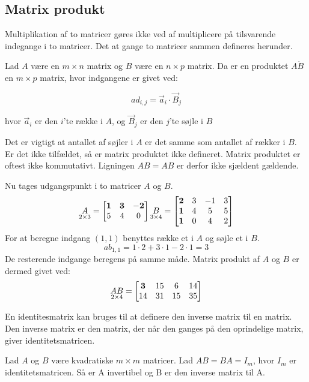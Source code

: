 \subsection{Matrix produkt}
Multiplikation af to matricer gøres ikke ved af multiplicere på tilsvarende indegange i to matricer. Det at gange to matricer sammen defineres herunder. 
\begin{defn} 
Lad $A$ være en $m \times n$ matrix og $B$ være en $n \times p$ matrix. Da er en produktet $A \dot B$ en $m \times p$ matrix, hvor indgangene er givet ved: 

$$ad_{i,j} = \vec{a}_i \cdot \vec{B}_j$$

hvor $\vec{a}_i$ er den $i$'te række i $A$, og $\vec{B}_j$ er den $j$'te søjle i $B$
\label{def:(matrixprodukt)}
\end{defn}
Det er vigtigt at antallet af søjler i $A$ er det samme som antallet af rækker i $B$. Er det ikke tilfældet, så er matrix produktet ikke defineret. Matrix produktet er oftest ikke kommutativt. Ligningen $AB=AB$ er derfor ikke sjældent gældende. 
\begin{eks}
Nu tages udgangspunkt i to matricer $A$ og $B$. 
\begin{align*}
\underset{2 \times 3}{A}= \begin{bmatrix}
	\bf{1} & \bf{3} & \bf{-2} \\
	5 & 4 & 0 	
\end{bmatrix}  
\underset{3 \times 4}{B}= \begin{bmatrix}
	\bf{2} & 3 & -1 & 3 \\
	\bf{1} & 4 & 5 & 5\\
	\bf{1} & 0 & 4 & 2
\end{bmatrix}  
\end{align*}
For at beregne indgang $(1,1)$ benyttes række et i $A$ og søjle et i $B$. 
$$ab_{1,1}=1\cdot 2+3\cdot 1-2 \cdot 1 = 3$$ 
De resterende indgange beregens på samme måde. 
Matrix produkt af $A$ og $B$ er dermed givet ved:
\begin{align*}
\underset{2 \times 4}{AB}= \begin{bmatrix}
	\bf{3} & 15 & 6 & 14 \\
	14 & 31 & 15 & 35
\end{bmatrix}  
\end{align*}
\end{eks}

En identitesmatrix kan bruges til at definere den inverse matrix til en matrix. Den inverse matrix er den matrix, der når den ganges på den oprindelige matrix, giver identitetsmatricen.
\begin{defn}
Lad $A$ og $B$ være kvadratiske $m \times m$ matricer. Lad $AB=BA=I_m$, hvor $I_m$ er identitetsmatricen. Så er A invertibel og B er den inverse matrix til A. 
\label{def(inversmatrix)}
\end{defn}


